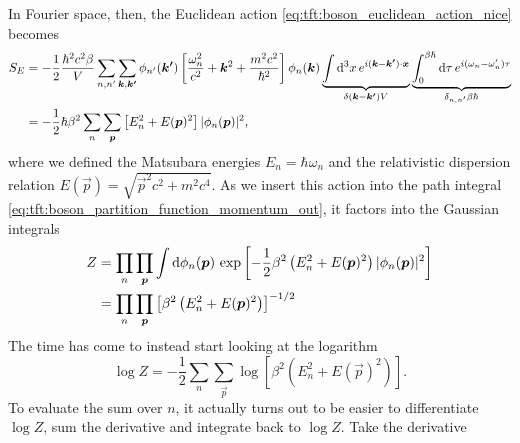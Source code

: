 

In Fourier space, then, the Euclidean action \eqref{eq:tft:boson_euclidean_action_nice} becomes
\begin{equation}
\begin{split}
	S_E & = -\frac12 \frac{\hbar^2 c^2 \beta}{V}
	        \sum_{n,n'} \sum_{{\bm{k}},{\bm{k'}}} 
	    	  \phi_{n'}({\bm{k'}}) 
	    	  \left[ \frac{\omega_n^2}{c^2} + {\bm{k}}^2 + \frac{m^2 c^2}{\hbar^2} \right] 
	  	  \phi_{n}({\bm{k}})
	  	  \underbrace{\int \mathop{}\!\mathrm{d}^3 x \, e^{i ({\bm{k}} - {\bm{k'}}) \cdot {\bm{x}}}}_{\delta({\bm{k}}-{\bm{k'}}) V}
	      \underbrace{\int_0^{\beta \hbar} \mathop{}\!\mathrm{d} \tau \, e^{i (\omega_n - \omega_n') \tau}}_{\delta_{n,n'} \beta \hbar}
	  	  \\
	    & = -\frac12 \hbar \beta^2
	        \sum_n \sum_{\bm{p}}
	  	    \left[ E_n^2 + E({\bm{p}})^2 \right] 
		    \lvert \phi_{n}({\bm{p}}) \rvert^2 ,
\end{split}
\end{equation}
where we defined the Matsubara energies $E_n = \hbar \omega_n$ and the relativistic dispersion relation $E(\vec{p}) = \sqrt{\vec{p}^2 c^2 + m^2 c^4}$.
As we insert this action into the path integral \eqref{eq:tft:boson_partition_function_momentum_out}, it factors into the Gaussian integrals
\begin{equation}
\begin{split}
	Z & =
	\prod_{n} \prod_{{\bm{p}}}
	\int \mathop{}\!\mathrm{d} \phi_n({\bm{p}}) \,
	\exp \left[
		-\frac12 \beta^2 \left(
			E_n^2 + E({\bm{p}})^2
		\right)
		\lvert \phi_n({\bm{p}}) \rvert^2
	\right] \\
	  & =
	\prod_{n} \prod_{{\bm{p}}} \left[ 
		\beta^2 \left( 
			E_n^2 + E({\bm{p}})^2
		\right)
	\right]^{-1/2}
\end{split}
\label{eq:tft:boson_gaussian_integral}
\end{equation}
The time has come to instead start looking at the logarithm
\begin{equation}
	\log Z = -\frac12 \sum_n \sum_\vec{p} 
	         \log \left[ \beta^2 \left( E_n^2 + E(\vec{p})^2 \right) \right] .
\end{equation}
To evaluate the sum over $n$, it actually turns out to be easier to differentiate $\log Z$, sum the derivative and integrate back to $\log Z$.
Take the derivative 
